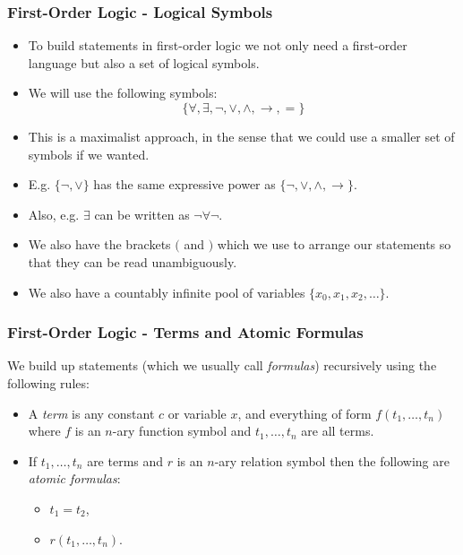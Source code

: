 \documentclass[handout]{beamer}
\newcommand{\ra}{\rightarrow}
\begin{document}
\begin{frame}
\frametitle{First-Order Logic - Logical Symbols}
\begin{itemize}
\item To build statements in first-order logic we not only need a first-order language but also a set of logical symbols. 
\item We will use the following symbols:
\[\{\forall,\exists,\neg,\vee,\wedge,\ra,=\}\]
\item This is a maximalist approach, in the sense that we could use a smaller set of symbols if we wanted. 
\item E.g. $\{\neg,\vee\}$ has the same expressive power as $\{\neg,\vee,\wedge,\ra\}$.
\item Also, e.g. $\exists$ can be written as $\neg\forall\neg$. 
\item We also have the brackets $($ and $)$ which we use to arrange our statements so that they can be read unambiguously. 
\item We also have a countably infinite pool of variables $\{x_0,x_1,x_2,\ldots\}$.
\end{itemize}
\end{frame}

\begin{frame}
\frametitle{First-Order Logic - Terms and Atomic Formulas}
We build up statements (which we usually call \emph{formulas}) recursively using the following rules:
\begin{itemize}
\item A \emph{term} is any constant $c$ or variable $x$, and everything of form $f(t_1,\ldots,t_n)$ where $f$ is an $n$-ary function symbol and $t_1,\ldots,t_n$ are all terms.
\vspace{0.5cm}
\item If $t_1,\ldots,t_n$ are terms and $r$ is an $n$-ary relation symbol then the following are \emph{atomic formulas}:
\begin{itemize}
\item $t_1=t_2$,
\item $r(t_1,\ldots,t_n)$.
\end{itemize}
\end{itemize}
\end{frame}
\end{document}
